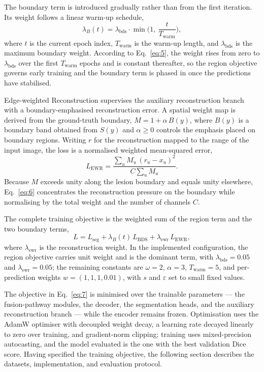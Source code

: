 The boundary term is introduced gradually rather than from the first iteration. Its weight follows a linear warm-up schedule,
\begin{equation}
\lambda_{B}(t) = \lambda_{\mathrm{bds}}\cdot\min\!\Big(1,\ \frac{t}{T_{\mathrm{warm}}}\Big), \tag{5}
\label{eq:5}
\end{equation}
where $t$ is the current epoch index, $T_{\mathrm{warm}}$ is the warm-up length, and $\lambda_{\mathrm{bds}}$ is the maximum boundary weight. According to Eq.~\eqref{eq:5}, the weight rises from zero to $\lambda_{\mathrm{bds}}$ over the first $T_{\mathrm{warm}}$ epochs and is constant thereafter, so the region objective governs early training and the boundary term is phased in once the predictions have stabilised.

Edge-weighted Reconstruction supervises the auxiliary reconstruction branch with a boundary-emphasised reconstruction error. A spatial weight map is derived from the ground-truth boundary, $M = 1 + \alpha\,B(y)$, where $B(y)$ is a boundary band obtained from $S(y)$ and $\alpha \ge 0$ controls the emphasis placed on boundary regions. Writing $r$ for the reconstruction mapped to the range of the input image, the loss is a normalised weighted mean-squared error,
\begin{equation}
L_{\mathrm{EWR}} = \frac{\sum_{u} M_u\,(r_u - x_u)^2}{C\sum_{u} M_u}. \tag{6}
\label{eq:6}
\end{equation}
Because $M$ exceeds unity along the lesion boundary and equals unity elsewhere, Eq.~\eqref{eq:6} concentrates the reconstruction pressure on the boundary while normalising by the total weight and the number of channels $C$.

The complete training objective is the weighted sum of the region term and the two boundary terms,
\begin{equation}
L = L_{\mathrm{seg}} + \lambda_{B}(t)\,L_{\mathrm{BDS}} + \lambda_{\mathrm{ewr}}\,L_{\mathrm{EWR}}, \tag{7}
\label{eq:7}
\end{equation}
where $\lambda_{\mathrm{ewr}}$ is the reconstruction weight. In the implemented configuration, the region objective carries unit weight and is the dominant term, with $\lambda_{\mathrm{bds}} = 0.05$ and $\lambda_{\mathrm{ewr}} = 0.05$; the remaining constants are $\omega = 2$, $\alpha = 3$, $T_{\mathrm{warm}} = 5$, and per-prediction weights $w = (1, 1, 1, 0.01)$, with $s$ and $\varepsilon$ set to small fixed values.

The objective in Eq.~\eqref{eq:7} is minimised over the trainable parameters --- the fusion-pathway modules, the decoder, the segmentation heads, and the auxiliary reconstruction branch --- while the encoder remains frozen. Optimisation uses the AdamW optimiser with decoupled weight decay, a learning rate decayed linearly to zero over training, and gradient-norm clipping; training uses mixed-precision autocasting, and the model evaluated is the one with the best validation Dice score. Having specified the training objective, the following section describes the datasets, implementation, and evaluation protocol.
